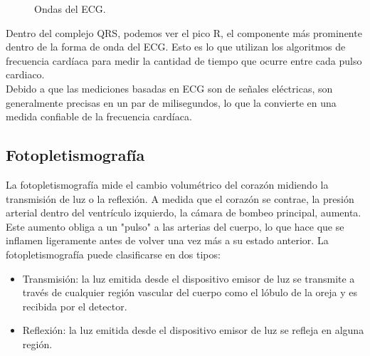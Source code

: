 		\begin{figure}[htbp!]
			\centering
			\caption{Ondas del ECG.}
			\label{fig:ECGwave}
		\end{figure}
		
		Dentro del complejo QRS, podemos ver el pico R, el componente más prominente dentro de la forma de onda del ECG. Esto es lo que utilizan los algoritmos de frecuencia cardíaca para medir la cantidad de tiempo que ocurre entre cada pulso cardiaco. \\
		
		Debido a que las mediciones basadas en ECG son de señales eléctricas, son generalmente precisas en un par de milisegundos, lo que la convierte en una medida confiable de la frecuencia cardíaca.
		
		\subsection{Fotopletismografía}
			La fotopletismografía mide el cambio volumétrico del corazón midiendo la transmisión de luz o la reflexión. A medida que el corazón se contrae, la presión arterial dentro del ventrículo izquierdo, la cámara de bombeo principal, aumenta. Este aumento obliga a un "pulso" a las arterias del cuerpo, lo que hace que se inflamen ligeramente antes de volver una vez más a su estado anterior. La fotopletismografía puede clasificarse en dos tipos: \\
			
			\begin{itemize}
				\item Transmisión: la luz emitida desde el dispositivo emisor de luz se transmite a través de cualquier región vascular del cuerpo como el lóbulo de la oreja y es recibida por el detector.
				\item Reflexión: la luz emitida desde el dispositivo emisor de luz se refleja en alguna región.
			\end{itemize}
			
